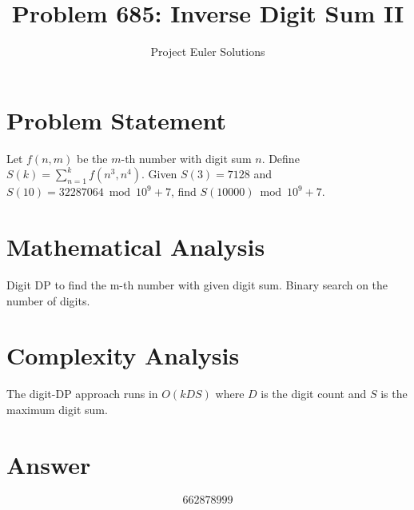 \documentclass[11pt]{article}
\title{Problem 685: Inverse Digit Sum II}
\author{Project Euler Solutions}
\date{}
\begin{document}
\maketitle

\section{Problem Statement}

Let $f(n,m)$ be the $m$-th number with digit sum $n$. Define $S(k)=\sum_{n=1}^{k} f(n^3,n^4)$. Given $S(3)=7128$ and $S(10)=32287064 \bmod 10^9+7$, find $S(10000)\bmod 10^9+7$.

\section{Mathematical Analysis}

Digit DP to find the m-th number with given digit sum. Binary search on the number of digits.

\section{Complexity Analysis}

The digit-DP approach runs in $O(kDS)$ where $D$ is the digit count and $S$ is the maximum digit sum.

\section{Answer}

\[
\boxed{662878999}
\]
\end{document}
